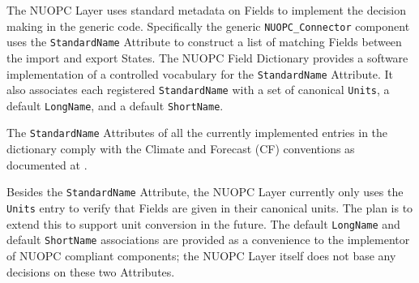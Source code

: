 %
The NUOPC Layer uses standard metadata on Fields to implement the decision making in the generic code. Specifically the generic {\tt NUOPC\_Connector} component uses the {\tt StandardName} Attribute to construct a list of matching Fields between the import and export States. The NUOPC Field Dictionary provides a software implementation of a controlled vocabulary for the {\tt StandardName} Attribute. It also associates each registered {\tt StandardName} with a set of canonical {\tt Units}, a default {\tt LongName}, and a default {\tt ShortName}.

The {\tt StandardName} Attributes of all the currently implemented entries in the dictionary comply with the Climate and Forecast (CF) conventions as documented at .

Besides the {\tt StandardName} Attribute, the NUOPC Layer currently only uses the {\tt Units} entry to verify that Fields are given in their canonical units. The plan is to extend this to support unit conversion in the future. The default {\tt LongName} and default {\tt ShortName} associations are provided as a convenience to the implementor of NUOPC compliant components; the NUOPC Layer itself does not base any decisions on these two Attributes.
